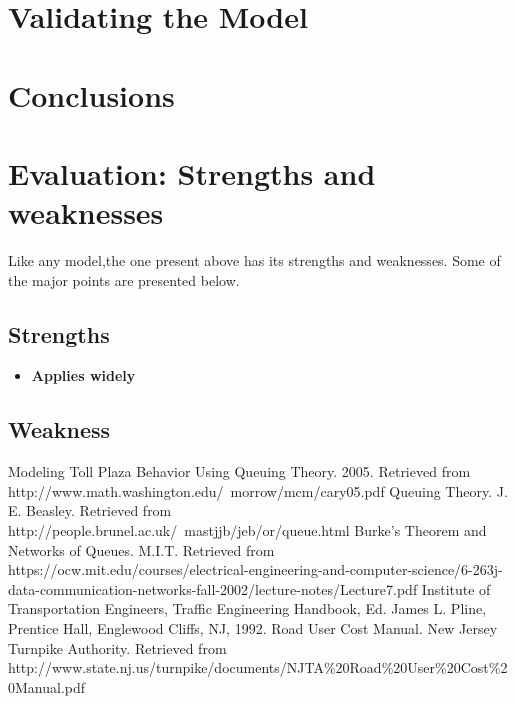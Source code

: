 \section{Validating the Model} 

\section{Conclusions}

\section{Evaluation: Strengths and weaknesses}
Like any model,the one present above has its strengths and
weaknesses. Some of the major points are presented below.

\subsection{Strengths}
\begin{itemize}
\item \textbf{Applies widely}
\end{itemize}

\subsection{Weakness}

\begin{thebibliography}{99}
\raggedright
{} Modeling Toll Plaza Behavior Using Queuing Theory. 2005. Retrieved from http://www.math.washington.edu/~morrow/mcm/cary05.pdf
 Queuing Theory. J. E. Beasley. Retrieved from http://people.brunel.ac.uk/~mastjjb/jeb/or/queue.html
 Burke's Theorem and Networks of Queues. M.I.T. Retrieved from https://ocw.mit.edu/courses/electrical-engineering-and-computer-science/6-263j-data-communication-networks-fall-2002/lecture-notes/Lecture7.pdf
 Institute of Transportation Engineers, Traffic Engineering Handbook, Ed. James L. Pline, Prentice Hall, Englewood Cliffs, NJ, 1992.
 Road User Cost Manual. New Jersey Turnpike Authority. Retrieved from http://www.state.nj.us/turnpike/documents/NJTA\%20Road\%20User\%20Cost\%20Manual.pdf
\end{thebibliography}